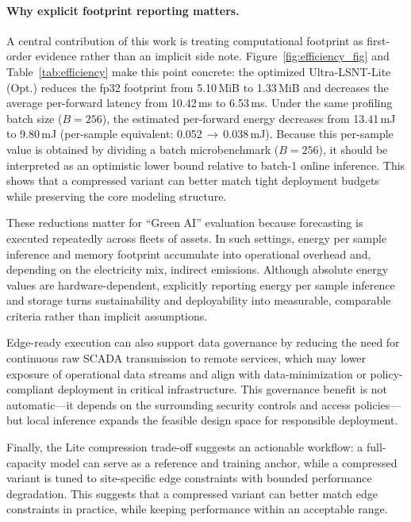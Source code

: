 \documentclass[review,3p,times]{elsarticle}
\begin{document}
\paragraph{Why explicit footprint reporting matters.}\label{subsec:disc_greenai}
A central contribution of this work is treating computational footprint as first-order evidence rather than an implicit side note. Figure~\ref{fig:efficiency_fig} and Table~\ref{tab:efficiency} make this point concrete: the optimized Ultra-LSNT-Lite (Opt.) reduces the fp32 footprint from 5.10\,MiB to 1.33\,MiB and decreases the average per-forward latency from 10.42\,ms to 6.53\,ms. Under the same profiling batch size ($B=256$), the estimated per-forward energy decreases from 13.41\,mJ to 9.80\,mJ (per-sample equivalent: 0.052\,$\rightarrow$\,0.038\,mJ). Because this per-sample value is obtained by dividing a batch microbenchmark ($B=256$), it should be interpreted as an optimistic lower bound relative to batch-1 online inference. This shows that a compressed variant can better match tight deployment budgets while preserving the core modeling structure.

These reductions matter for ``Green AI'' evaluation because forecasting is executed repeatedly across fleets of assets. In such settings, energy per sample inference and memory footprint accumulate into operational overhead and, depending on the electricity mix, indirect emissions. Although absolute energy values are hardware-dependent, explicitly reporting energy per sample inference and storage turns sustainability and deployability into measurable, comparable criteria rather than implicit assumptions.

Edge-ready execution can also support data governance by reducing the need for continuous raw SCADA transmission to remote services, which may lower exposure of operational data streams and align with data-minimization or policy-compliant deployment in critical infrastructure. This governance benefit is not automatic---it depends on the surrounding security controls and access policies---but local inference expands the feasible design space for responsible deployment.

Finally, the Lite compression trade-off suggests an actionable workflow: a full-capacity model can serve as a reference and training anchor, while a compressed variant is tuned to site-specific edge constraints with bounded performance degradation. This suggests that a compressed variant can better match edge constraints in practice, while keeping performance within an acceptable range.
\end{document}
